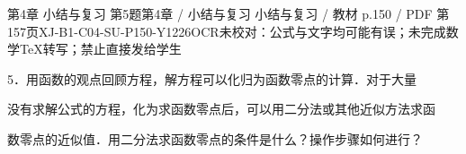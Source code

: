 \begin{bankitem}{第4章 小结与复习 第5题}{第4章 / 小结与复习 小结与复习 / 教材 p.150 / PDF 第157页}{XJ-B1-C04-SU-P150-Y1226}{OCR未校对：公式与文字均可能有误；未完成数学TeX转写；禁止直接发给学生}
\begin{ocrdraft}
\par
5．用函数的观点回顾方程，解方程可以化归为函数零点的计算．对于大量
\par
没有求解公式的方程，化为求函数零点后，可以用二分法或其他近似方法求函
\par
数零点的近似值．用二分法求函数零点的条件是什么？操作步骤如何进行？
\end{ocrdraft}
\end{bankitem}
